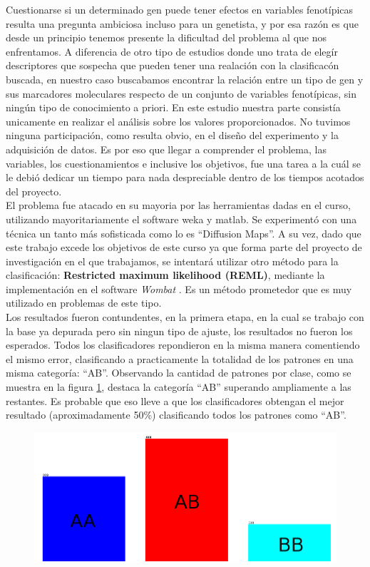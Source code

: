 \documentclass[12pt,a4paper,titlepage]{report}
\begin{document}
Cuestionarse si un determinado gen puede tener efectos en variables fenotípicas resulta una pregunta ambiciosa incluso para un genetista, y por esa razón es que desde un principio tenemos presente la dificultad del problema al que nos enfrentamos. A diferencia de otro tipo de estudios donde uno trata de elegír descriptores que sospecha que pueden tener una realación con la clasificacón buscada, en nuestro caso buscabamos encontrar la relación entre un tipo de gen y sus marcadores moleculares respecto de un conjunto de variables fenotípicas, sin ningún tipo de conocimiento a priori. En este estudio nuestra parte consistía unicamente en realizar el análisis sobre los valores proporcionados. No tuvimos ninguna participación, como resulta obvio, en el diseño del experimento y la adquisición de datos. Es por eso que llegar a comprender el problema, las variables, los cuestionamientos e inclusive los objetivos, fue una tarea a la cuál se le debió dedicar un tiempo para nada despreciable dentro de los tiempos acotados del proyecto.\\

El problema fue atacado en su mayoria por las herramientas dadas en el curso, utilizando mayoritariamente el software weka y matlab. Se experimentó con una técnica un tanto más sofisticada como lo es ``Diffusion Maps''. A su vez, dado que este trabajo excede los objetivos de este curso ya que forma parte del proyecto de investigación en el que trabajamos, se intentará utilizar otro método para la clasificación: \textbf{Restricted maximum likelihood (REML)}, mediante la implementación en el software \emph{Wombat} \cite{bib:REML}. Es un método prometedor que es muy utilizado en problemas de este tipo.\\

Los resultados fueron contundentes, en la primera etapa, en la cual se trabajo con la base ya depurada pero sin ningun tipo de ajuste, los resultados no fueron los esperados. Todos los clasificadores repondieron en la misma manera comentiendo el mismo error, clasificando a practicamente la totalidad de los patrones en una misma categoría: ``AB''.  Observando la cantidad de patrones por clase, como se muestra en la figura \ref{fig:desbalance_clases}, destaca la categoría ``AB'' superando ampliamente a las restantes. Es probable que eso lleve a que los clasificadores obtengan el mejor resultado (aproximadamente 50\%) clasificando todos los patrones como ``AB''.\\

\begin{figure}[H]
	\centering 
	\includegraphics[width=.75\textwidth]{./pics/desbalance_clases.png}
	\caption{}
	\label{fig:desbalance_clases}
\end{figure}
\end{document}
